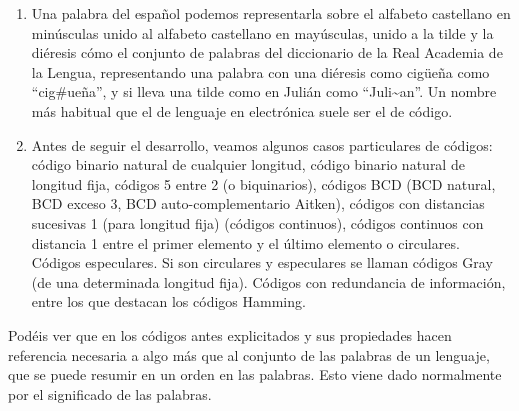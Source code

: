 \begin{enumerate}
\begin{enumerate}
    única condición que sea finita, y que puede ser vacía).
  \item
    Una palabra del español podemos representarla sobre el alfabeto
    castellano en minús\-culas unido al alfabeto castellano en
    mayúsculas, unido a la tilde y la diéresis cómo el conjunto de
    palabras del diccionario de la Real Academia de la Lengua,
    represen\-tando una palabra con una diéresis como cigüeña como
    ``cig\#ueña'', y si lleva una til\-de como en Julián como
    ``Juli\textasciitilde an''. Un nombre más habitual que el de
    lenguaje en electrónica suele ser el de código.
  \item
    Antes de seguir el desarrollo, veamos algunos casos particulares de
    códigos: código binario natural de cualquier longitud, código
    binario natural de longitud fija, códigos 5 entre 2 (o biquinarios),
    códigos BCD (BCD natural, BCD exceso 3, BCD auto-complementario
    Aitken), códigos con distancias sucesivas 1 (para longitud fija)
    (códigos continuos), códigos continuos con distancia 1 entre el
    primer elemento y el último elemento o circulares. Códigos
    especulares. Si son circulares y especulares se llaman códigos Gray
    (de una determinada longitud fija). Códigos con redundancia de
    infor\-mación, entre los que destacan los códigos Hamming.
  \end{enumerate}
\end{enumerate}

Podéis ver que en los códigos antes explicitados y sus propiedades hacen
referencia necesaria a algo más que al conjunto de las palabras de un
lenguaje, que se puede re\-sumir en un orden en las palabras. Esto viene
dado normalmente por el significado de las palabras.

